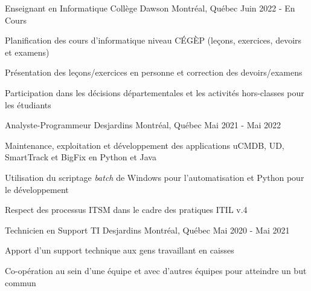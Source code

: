 

\begin{cventries}

  
  \cventry
    {Enseignant en Informatique} %
    {Collège Dawson} %
    {Montréal, Québec} %
    {Juin 2022 - En Cours} %
    {
      \begin{cvitems} %
        \item {Planification des cours d'informatique niveau CÉGÈP (leçons, exercices, devoirs et examens)}
        \item {Présentation des leçons/exercices en personne et correction des devoirs/examens}
        \item {Participation dans les décisions départementales et les activités hors-classes pour les étudiants}
      \end{cvitems}
    }
 
  \cventry
    {Analyste-Programmeur} %
    {Desjardins} %
    {Montréal, Québec} %
    {Mai 2021 - Mai 2022} %
    {
      \begin{cvitems} %
        \item {Maintenance, exploitation et développement des applications uCMDB, UD, SmartTrack et BigFix en Python et Java}
        \item {Utilisation du scriptage \textit{batch} de Windows pour l'automatisation et Python pour le développement}
        \item {Respect des processus ITSM dans le cadre des pratiques ITIL v.4}
      \end{cvitems}
    }

  \cventry
    {Technicien en Support TI} %
    {Desjardins} %
    {Montréal, Québec} %
    {Mai 2020 - Mai 2021} %
    {
      \begin{cvitems} %
        \item {Apport d'un support technique aux gens travaillant en caisses}
        \item {Co-opération au sein d'une équipe et avec d'autres équipes pour atteindre un but commun}
      \end{cvitems}
    }
    

\end{cventries}

